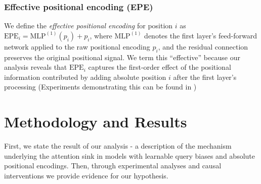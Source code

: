 \documentclass[11pt]{article}
\newif\ifYRMcomments
\newcommand{\YRM}[1]{\ifYRMcomments\textcolor{red}{[YRM: #1]}\fi}
\begin{document}
\subsubsection{Effective positional encoding (EPE)}
We define the \emph{effective positional encoding} for position $i$ as $\mathrm{EPE}_i = \mathrm{MLP}^{(1)}(p_i) + p_i$, where $\mathrm{MLP}^{(1)}$ denotes the first layer's feed-forward network applied to the raw positional encoding $p_i$, and the residual connection preserves the original positional signal.  We term this ``effective'' because our analysis reveals that $\mathrm{EPE}_i$ captures the first-order effect of the positional information contributed by adding absolute position $i$ after the first layer's processing (Experiments demonstrating this can be found in \YRM{Do an experiment to show this, put it in the appendix, and cref to it here})

\section{Methodology and Results}
First, we state the result of our analysis - a description of the mechanism underlying the attention sink in models with learnable query biases and absolute positional encodings. Then, through experimental analyses and causal interventions we provide evidence for our hypothesis.
\end{document}
